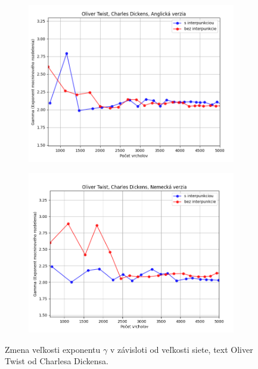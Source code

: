\begin{figure}[htbp]
    \centering
    \begin{subfigure}[b]{0.9\textwidth}
        \includegraphics[width=\textwidth]{images/Growth/Screenshot_17.png}
    \end{subfigure}

    \vspace{0.3cm}

    \begin{subfigure}[b]{0.9\textwidth}
        \includegraphics[width=\textwidth]{images/Growth/Screenshot_18.png}
    \end{subfigure}
    
    \vspace{0.3cm}
    \caption{Zmena veľkosti exponentu $\gamma$ v závisloti od veľkosti siete, text Oliver Twist od Charlesa Dickensa.}\label{fig:growthTwist}
\end{figure}

